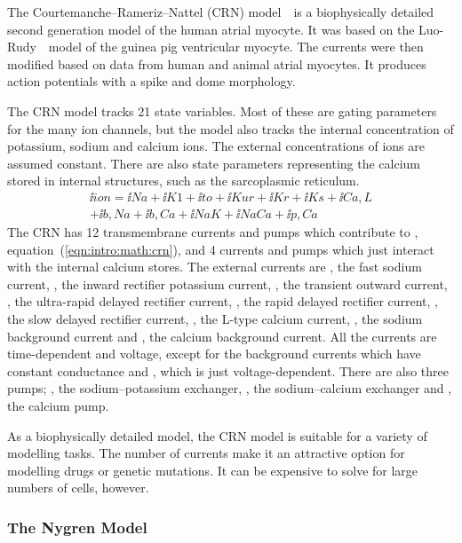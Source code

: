 The Courtemanche--Rameriz--Nattel (CRN) model~\cite{CRN98}\ is a biophysically
detailed second generation model of the human atrial myocyte.
It was based on the Luo-Rudy~\cite{Luo1994}\ model of the guinea pig ventricular
myocyte.
The currents were then modified based on data from human and animal atrial
myocytes.
It produces action potentials with a spike and dome morphology.

The CRN model tracks 21 state variables.
Most of these are gating parameters for the many ion channels, but the model
also tracks the internal concentration of potassium, sodium and calcium ions.
The external concentrations of ions are assumed constant.
There are also state parameters representing the calcium stored in internal
structures, such as the sarcoplasmic reticulum.
\begin{align}
\label{eqn:intro:math:crn}
\ii{ion} = \ii{Na} + \ii{K1} + \ii{to} + \ii{Kur} + \ii{Kr} + \ii{Ks} + 
\ii{Ca,L} \nonumber \\
+ \ii{b,Na} + \ii{b,Ca} + \ii{NaK} + \ii{NaCa} + \ii{p,Ca}
\end{align}
The CRN has 12 transmembrane currents and pumps which contribute to ,
equation~(\ref{eqn:intro:math:crn}), and 4 currents and
pumps which just interact with the internal calcium stores.
The external currents are , the fast sodium current, , the inward
rectifier potassium current, , the transient outward current, , the
ultra-rapid delayed rectifier current, , the rapid delayed rectifier
current, , the slow delayed rectifier current, , the L-type
calcium current, , the sodium background current and , the
calcium background current.
All the currents are time-dependent and voltage, except for the background currents which
have constant conductance and , which is just voltage-dependent.
There are also three pumps; , the sodium--potassium exchanger,
, the sodium--calcium exchanger and , the calcium pump.

As a biophysically detailed model, the CRN model is suitable for a variety of
modelling tasks.
The number of currents make it an attractive option for modelling drugs or
genetic mutations.
It can be expensive to solve for large numbers of cells, however.

\subsubsection{The Nygren Model}

